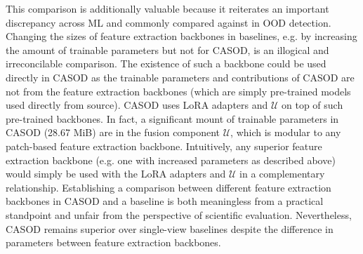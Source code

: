 This comparison is additionally valuable because it reiterates an important discrepancy across ML and commonly compared against in OOD detection. Changing the sizes of feature extraction backbones in baselines, e.g. by increasing the amount of trainable parameters but not for CASOD, is an illogical and irreconcilable comparison. The existence of such a backbone could be used directly in CASOD as the trainable parameters and contributions of CASOD are not from the feature extraction backbones (which are simply pre-trained models used directly from source). CASOD uses LoRA adapters and $\mathcal{U}$ on top of such pre-trained backbones. In fact, a significant mount of trainable parameters in CASOD (28.67 MiB) are in the fusion component $\mathcal{U}$, which is modular to any patch-based feature extraction backbone. Intuitively, any superior feature extraction backbone (e.g. one with increased parameters as described above) would simply be used with the LoRA adapters and $\mathcal{U}$ in a complementary relationship. Establishing a comparison between different feature extraction backbones in CASOD and a baseline is both meaningless from a practical standpoint and unfair from the perspective of scientific evaluation. Nevertheless, CASOD remains superior over single-view baselines despite the difference in parameters between feature extraction backbones.

%	

